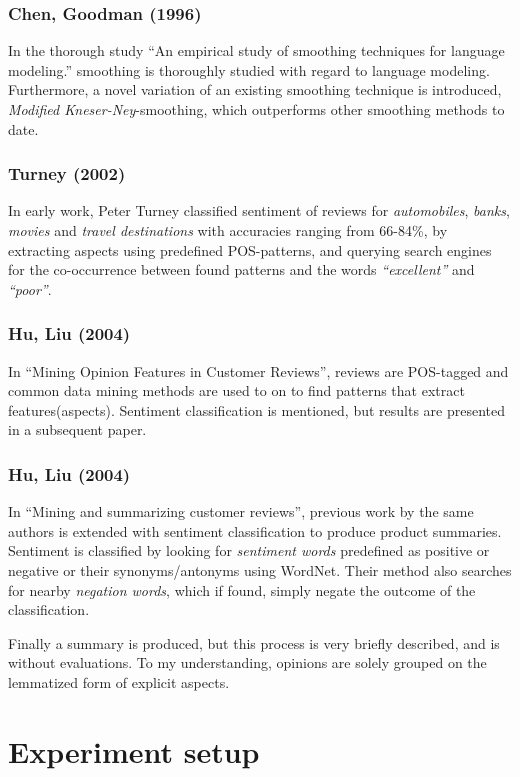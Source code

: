 \documentclass[a4paper,11pt]{kth-mag}
\begin{document}
\subsubsection{Chen, Goodman (1996)}
In the thorough study ``An empirical study of smoothing techniques for language modeling.'' smoothing is
thoroughly studied with regard to language modeling. Furthermore, a novel variation of an existing
smoothing technique is introduced, \emph{Modified Kneser-Ney}-smoothing, which outperforms other
smoothing methods to date.


\subsubsection{Turney (2002)}
In early work, Peter Turney classified sentiment of reviews for \emph{automobiles}, \emph{banks}, \emph{movies} and \emph{travel destinations} with accuracies ranging from 66-84\%, by extracting aspects using predefined POS-patterns, and querying search engines for the co-occurrence between found patterns and the words \emph{``excellent''} and \emph{``poor''}.

\subsubsection{Hu, Liu (2004)}
In ``Mining Opinion Features in Customer Reviews'', reviews are POS-tagged and common data mining methods are used to on to find patterns that extract features(aspects). Sentiment classification is mentioned, but results are presented in a subsequent paper.

\subsubsection{Hu, Liu (2004)}
In ``Mining and summarizing customer reviews'', previous work by the same authors is extended with sentiment classification to produce product summaries. Sentiment is classified by looking for \emph{sentiment words} predefined as positive or negative or their synonyms/antonyms using WordNet. Their method also searches for nearby \emph{negation words}, which if found, simply negate the outcome of the classification.

Finally a summary is produced, but this process is very briefly described, and is without evaluations. To my understanding, opinions are solely grouped on the lemmatized form of explicit aspects.


\pagebreak
\section{Experiment setup}
\end{document}
